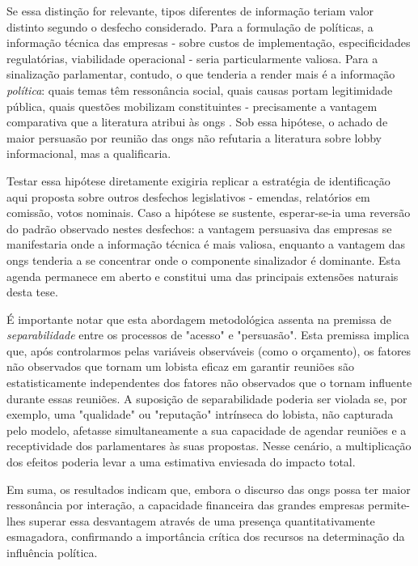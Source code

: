 Se essa distinção for relevante, tipos diferentes de informação teriam valor distinto segundo o desfecho considerado. Para a formulação de políticas, a informação técnica das empresas - sobre custos de implementação, especificidades regulatórias, viabilidade operacional - seria particularmente valiosa. Para a sinalização parlamentar, contudo, o que tenderia a render mais é a informação \textit{política}: quais temas têm ressonância social, quais causas portam legitimidade pública, quais questões mobilizam constituintes - precisamente a vantagem comparativa que a literatura atribui às \acrshort{ong}s \cite{bunea2018legitimacy, pereira2025participacao}. Sob essa hipótese, o achado de maior persuasão por reunião das \acrshort{ong}s não refutaria a literatura sobre lobby informacional, mas a qualificaria.

Testar essa hipótese diretamente exigiria replicar a estratégia de identificação aqui proposta sobre outros desfechos legislativos - emendas, relatórios em comissão, votos nominais. Caso a hipótese se sustente, esperar-se-ia uma reversão do padrão observado nestes desfechos: a vantagem persuasiva das empresas se manifestaria onde a informação técnica é mais valiosa, enquanto a vantagem das \acrshort{ong}s tenderia a se concentrar onde o componente sinalizador é dominante. Esta agenda permanece em aberto e constitui uma das principais extensões naturais desta tese.

É importante notar que esta abordagem metodológica assenta na premissa de \textit{separabilidade} entre os processos de "acesso" e "persuasão". Esta premissa implica que, após controlarmos pelas variáveis observáveis (como o orçamento), os fatores não observados que tornam um lobista eficaz em garantir reuniões são estatisticamente independentes dos fatores não observados que o tornam influente durante essas reuniões. A suposição de separabilidade poderia ser violada se, por exemplo, uma "qualidade" ou "reputação" intrínseca do lobista, não capturada pelo modelo, afetasse simultaneamente a sua capacidade de agendar reuniões e a receptividade dos parlamentares às suas propostas. Nesse cenário, a multiplicação dos efeitos poderia levar a uma estimativa enviesada do impacto total.

Em suma, os resultados indicam que, embora o discurso das \acrshort{ong}s possa ter maior ressonância por interação, a capacidade financeira das grandes empresas permite-lhes superar essa desvantagem através de uma presença quantitativamente esmagadora, confirmando a importância crítica dos recursos na determinação da influência política.